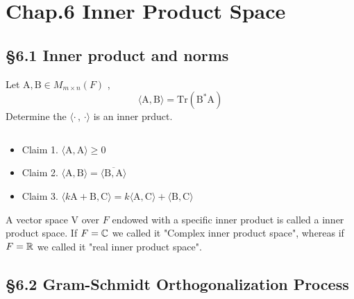 


	\section*{Chap.6 Inner Product Space}		\subsection*{\S 6.1 Inner product and norms}
	
	
	
	
	\begin{example}
		Let $\mathrm{A} , \mathrm{B}\in M_{m\times n}(F)$ ,  $$\langle\mathrm{A}, \mathrm{B}\rangle = \mathrm{Tr}\left(\mathrm{B}^*\mathrm{A}\right)$$ Determine the $\langle\cdot \,,\, \cdot\rangle$ is an inner prduct.
		\begin{sol*}
			$ $
			\begin{itemize}
				\item Claim 1. $\langle\mathrm{A} , \mathrm{A}\rangle \geq 0 $
				\item Claim 2. $\langle\mathrm{A},\mathrm{B}\rangle = \overline{\langle\mathrm{B} , \mathrm{A}\rangle}$
				\item Claim 3. $\langle k\mathrm{A}+\mathrm{B} , \mathrm{C}\rangle = k\langle\mathrm{A} , \mathrm{C}\rangle + \langle\mathrm{B},\mathrm{C}\rangle$
			\end{itemize}
		\end{sol*}
	\end{example}
	\begin{warn}[Notice :]
		A vector space $\mathrm{V}$ over $F$ endowed with a specific inner product is called a inner product space.
		If $F = \mathbb{C}$ we called it "Complex inner product space", whereas if $F = \mathbb{R}$ we called it "real inner product space".  
	\end{warn}
	
	\subsection*{\S 6.2 Gram-Schmidt Orthogonalization Process}
